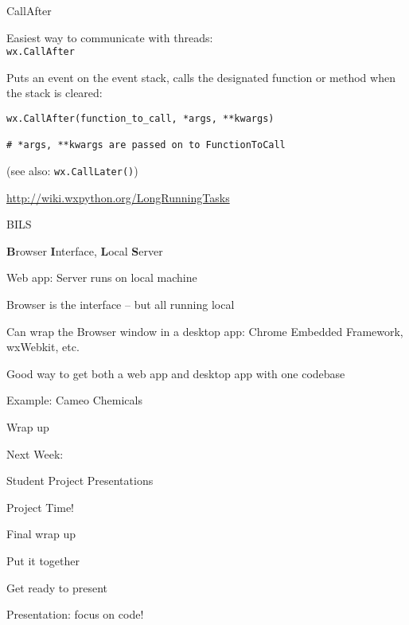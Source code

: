 \documentclass{beamer}
\begin{document}
\begin{frame}[fragile]{CallAfter}

\vfill
{\Large Easiest way to communicate with threads:\\
 \verb`wx.CallAfter`}

\vfill
{\Large Puts an event on the event stack, calls the designated function or method when the stack is cleared:}

\begin{verbatim}
wx.CallAfter(function_to_call, *args, **kwargs)

# *args, **kwargs are passed on to FunctionToCall
\end{verbatim}

{\large (see also: \verb`wx.CallLater()`) }

\vfill
\url{http://wiki.wxpython.org/LongRunningTasks}

\end{frame}




\begin{frame}[fragile]{BILS}

\vfill
{\Large {\bf B}rowser {\bf I}nterface, {\bf L}ocal {\bf S}erver}
\vfill

\vfill
{\Large Web app: Server runs on local machine}
\vfill

\vfill
{\Large Browser is the interface -- but all running local}

\vfill
{\Large Can wrap the Browser window in a desktop app: Chrome Embedded Framework, wxWebkit, etc.}

\vfill
{\Large Good way to get both a web app and desktop app with one codebase}

\vfill
{\Large Example: Cameo Chemicals}

\end{frame}


\begin{frame}[fragile]{Wrap up}

\vfill
{\Large }
\vfill

\end{frame}

\begin{frame}{Next Week:}

\vfill
{\LARGE Student Project Presentations}

\vfill

\end{frame}

\begin{frame}[fragile]{Project Time!}

\vfill
\Large{Final wrap up}

\vfill
\Large{Put it together}

\vfill
\Large{Get ready to present}

\vfill
\Large{Presentation: focus on code!}

\end{frame}
\end{document}
